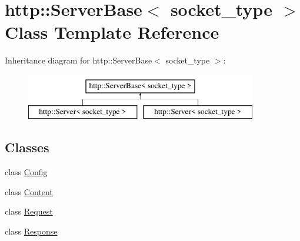 \hypertarget{classhttp_1_1_server_base}{}\section{http\+:\+:Server\+Base$<$ socket\+\_\+type $>$ Class Template Reference}
\label{classhttp_1_1_server_base}
Inheritance diagram for http\+:\+:Server\+Base$<$ socket\+\_\+type $>$\+:\begin{figure}[H]
\begin{center}
\leavevmode
\includegraphics[height=2.000000cm]{d3/d7a/classhttp_1_1_server_base}
\end{center}
\end{figure}
\subsection*{Classes}
\begin{DoxyCompactItemize}
\item 
class \hyperlink{classhttp_1_1_server_base_1_1_config}{Config}
\item 
class \hyperlink{classhttp_1_1_server_base_1_1_content}{Content}
\item 
class \hyperlink{classhttp_1_1_server_base_1_1_request}{Request}
\item 
class \hyperlink{classhttp_1_1_server_base_1_1_response}{Response}
\end{DoxyCompactItemize}
